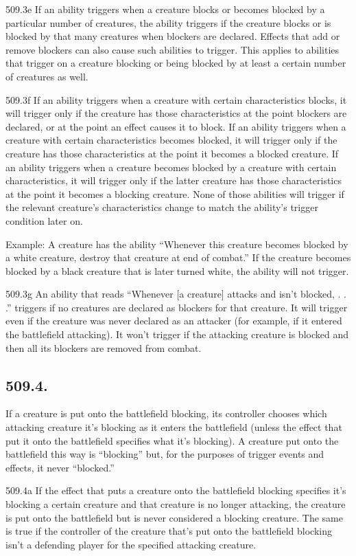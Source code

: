 509.3e If an ability triggers when a creature blocks or becomes blocked by a particular number of creatures, the ability triggers if the creature blocks or is blocked by that many creatures when blockers are declared. Effects that add or remove blockers can also cause such abilities to trigger. This applies to abilities that trigger on a creature blocking or being blocked by at least a certain number of creatures as well.

509.3f If an ability triggers when a creature with certain characteristics blocks, it will trigger only if the creature has those characteristics at the point blockers are declared, or at the point an effect causes it to block. If an ability triggers when a creature with certain characteristics becomes blocked, it will trigger only if the creature has those characteristics at the point it becomes a blocked creature. If an ability triggers when a creature becomes blocked by a creature with certain characteristics, it will trigger only if the latter creature has those characteristics at the point it becomes a blocking creature. None of those abilities will trigger if the relevant creature’s characteristics change to match the ability’s trigger condition later on.

Example: A creature has the ability “Whenever this creature becomes blocked by a white creature, destroy that creature at end of combat.” If the creature becomes blocked by a black creature that is later turned white, the ability will not trigger.

509.3g An ability that reads “Whenever [a creature] attacks and isn’t blocked, . . .” triggers if no creatures are declared as blockers for that creature. It will trigger even if the creature was never declared as an attacker (for example, if it entered the battlefield attacking). It won’t trigger if the attacking creature is blocked and then all its blockers are removed from combat.

\subsection*{509.4.}
If a creature is put onto the battlefield blocking, its controller chooses which attacking creature it’s blocking as it enters the battlefield (unless the effect that put it onto the battlefield specifies what it’s blocking). A creature put onto the battlefield this way is “blocking” but, for the purposes of trigger events and effects, it never “blocked.”

509.4a If the effect that puts a creature onto the battlefield blocking specifies it’s blocking a certain creature and that creature is no longer attacking, the creature is put onto the battlefield but is never considered a blocking creature. The same is true if the controller of the creature that’s put onto the battlefield blocking isn’t a defending player for the specified attacking creature.

